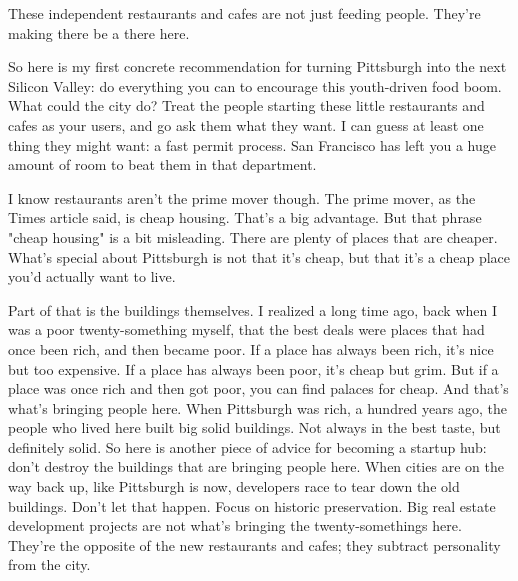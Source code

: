 These independent restaurants and cafes
                  are not just feeding people. They're making there be a there
                  here.

So here is my first concrete recommendation
                  for turning Pittsburgh into the next Silicon Valley: do
                  everything you can to encourage this youth-driven food boom.
                  What could the city do? Treat the people starting these little
                  restaurants and cafes as your users, and go ask them what they
                  want. I can guess at least one thing they might want: a fast
                  permit process. San Francisco has left you a huge amount of
                  room to beat them in that department.

I know
                  restaurants aren't the prime mover though. The prime mover, as
                  the Times article said, is cheap housing. That's a big
                  advantage. But that phrase "cheap housing" is a bit
                  misleading. There are plenty of places that are cheaper.
                  What's special about Pittsburgh is not that it's cheap, but
                  that it's a cheap place you'd actually want to live.

Part
                  of that is the buildings themselves. I realized a long time
                  ago, back when I was a poor twenty-something myself, that the
                  best deals were places that had once been rich, and then
                  became poor. If a place has always been rich, it's nice but
                  too expensive. If a place has always been poor, it's cheap but
                  grim. But if a place was once rich and then got poor, you can
                  find palaces for cheap. And that's what's bringing people
                  here. When Pittsburgh was rich, a hundred years ago, the
                  people who lived here built big solid buildings. Not always in
                  the best taste, but definitely solid. So here is another piece
                  of advice for becoming a startup hub: don't destroy the
                  buildings that are bringing people here. When cities are on
                  the way back up, like Pittsburgh is now, developers race to
                  tear down the old buildings. Don't let that happen. Focus on
                  historic preservation. Big real estate development projects
                  are not what's bringing the twenty-somethings here. They're
                  the opposite of the new restaurants and cafes; they subtract
                  personality from the city.

